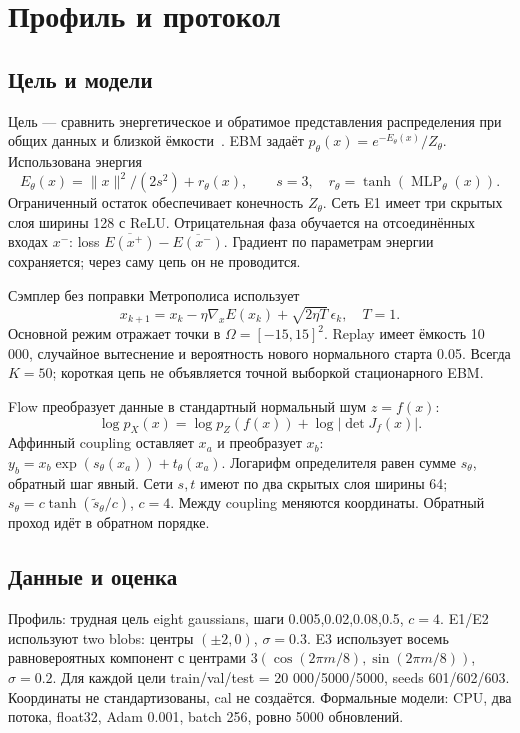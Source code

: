 \section{Профиль и протокол}
\subsection{Цель и модели}
Цель --- сравнить энергетическое и обратимое представления распределения при общих данных и близкой ёмкости~\cite{teacher}. EBM задаёт $p_\theta(x)=e^{-E_\theta(x)}/Z_\theta$. Использована энергия
\begin{equation}E_\theta(x)=\|x\|^2/(2s^2)+r_\theta(x),\qquad s=3,\quad r_\theta=\tanh(\operatorname{MLP}_\theta(x)).\end{equation}
Ограниченный остаток обеспечивает конечность $Z_\theta$. Сеть E1 имеет три скрытых слоя ширины 128 с ReLU. Отрицательная фаза обучается на отсоединённых входах $x^-$: loss $\overline{E(x^+)}-\overline{E(x^-)}$. Градиент по параметрам энергии сохраняется; через саму цепь он не проводится.

Сэмплер без поправки Метрополиса использует
\begin{equation}x_{k+1}=x_k-\eta\nabla_xE(x_k)+\sqrt{2\eta T}\,\epsilon_k,\quad T=1.\end{equation}
Основной режим отражает точки в $\Omega=[-15,15]^2$. Replay имеет ёмкость 10 000, случайное вытеснение и вероятность нового нормального старта 0.05. Всегда $K=50$; короткая цепь не объявляется точной выборкой стационарного EBM.

Flow преобразует данные в стандартный нормальный шум $z=f(x)$:
\begin{equation}\log p_X(x)=\log p_Z(f(x))+\log|\det J_f(x)|.\end{equation}
Аффинный coupling оставляет $x_a$ и преобразует $x_b$: $y_b=x_b\exp(s_\theta(x_a))+t_\theta(x_a)$. Логарифм определителя равен сумме $s_\theta$, обратный шаг явный. Сети $s,t$ имеют по два скрытых слоя ширины 64; $s_\theta=c\tanh(\tilde s_\theta/c)$, $c=4$. Между coupling меняются координаты. Обратный проход идёт в обратном порядке.

\subsection{Данные и оценка}
Профиль: трудная цель eight gaussians, шаги 0.005,0.02,0.08,0.5, $c=4$. E1/E2 используют two blobs: центры $(\pm2,0)$, $\sigma=0.3$. E3 использует восемь равновероятных компонент с центрами $3(\cos(2\pi m/8),\sin(2\pi m/8))$, $\sigma=0.2$. Для каждой цели train/val/test = 20 000/5000/5000, seeds 601/602/603. Координаты не стандартизованы, cal не создаётся. Формальные модели: CPU, два потока, float32, Adam 0.001, batch 256, ровно 5000 обновлений.

